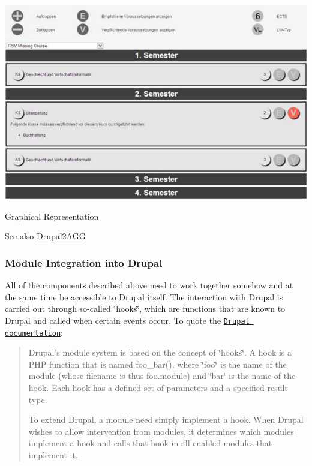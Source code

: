 \begin{DoxyImage}
\includegraphics[width=\textwidth]{Drupal2AGG}
\caption{Graphical Representation}
\end{DoxyImage}


\begin{DoxySeeAlso}{See also}
\hyperlink{group___drupal2_a_g_g}{Drupal2\+A\+G\+G}
\end{DoxySeeAlso}
\hypertarget{index_Integration}{}\subsubsection{Module Integration into Drupal}\label{index_Integration}
All of the components described above need to work together somehow and at the same time be accessible to Drupal itself. The interaction with Drupal is carried out through so-\/called \char`\"{}hooks\char`\"{}, which are functions that are known to Drupal and called when certain events occur. To quote the \href{https://api.drupal.org/api/drupal/includes!module.inc/group/hooks/7}{\tt Drupal documentation}\+: \begin{quote}
Drupal's module system is based on the concept of \char`\"{}hooks\char`\"{}. A hook is a P\+H\+P function that is named foo\+\_\+bar(), where \char`\"{}foo\char`\"{} is the name of the module (whose filename is thus foo.\+module) and \char`\"{}bar\char`\"{} is the name of the hook. Each hook has a defined set of parameters and a specified result type.

To extend Drupal, a module need simply implement a hook. When Drupal wishes to allow intervention from modules, it determines which modules implement a hook and calls that hook in all enabled modules that implement it. \end{quote}



